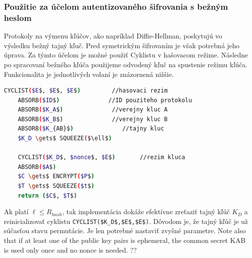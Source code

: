 \subsubsection{Použitie za účelom autentizovaného šifrovania s bežným heslom}
Protokoly na výmenu kľúčov, ako napríklad Diffie-Hellman, poskytujú vo výsledku bežný tajný kľuč. Pred symetrickým šifrovaním je však potrebná jeho úprava. Za týmto účelom je možné použiť Cyklistu v hašovacom režime. Následne po spracovaní bežného kľúča použijeme odvodený kľuč na spustenie režimu kľúča. Funkcionalita je jednotlivých volaní je znázornená nižšie.
\begin{lstlisting}[language=bash,mathescape=true]
	CYCLIST($E$, $E$, $E$)         //hasovaci rezim
	ABSORB($ID$)              //ID pouziteho protokolu
	ABSORB($K_A$)              //verejny kluc A
	ABSORB($K_B$)              //verejny kluc B 
	ABSORB($K_{AB}$)              //tajny kluc 
	$K_D \gets$ SQUEEZE($\ell$)
	
	CYCLIST($K_D$, $nonce$, $E$)       //rezim kluca
	ABSORB($A$)
	$C \gets$ ENCRYPT($P$)
	$T \gets$ SQUEEZE($t$)
	return ($C$, $T$)
\end{lstlisting} 
Ak platí $\ell \leq R_{hash}$, tak implementácia dokáže efektívne zreťaziť tajný kľúč $K_D$ a reinicializovať cyklistu \lstinline|CYCLIST($K_D$,$E$,$E$)|. Dôvodom je, že tajný kľúč je už súčasťou stavu permutácie. Je len potrebné nastaviť zvyšné parametre. Note also that if at least one of the public key pairs is ephemeral, the common secret
KAB is used only once and no nonce is needed. ??\cite{xdr2, 3.3}  